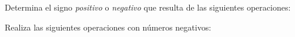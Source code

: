 \documentclass[12pt,addpoints]{evalua}
\begin{document}
\begin{questions}
\begin{multicols}{2}
    \end{multicols}

    \question[4] Determina el signo \textit{positivo} o \textit{negativo} que resulta de las siguientes operaciones:
    
    \begin{multicols}{2}
    \end{multicols}

    \question[4] Realiza las siguientes operaciones con números negativos:
   
    \begin{multicols}{2}
    \end{multicols}
\end{questions}
\end{document}
